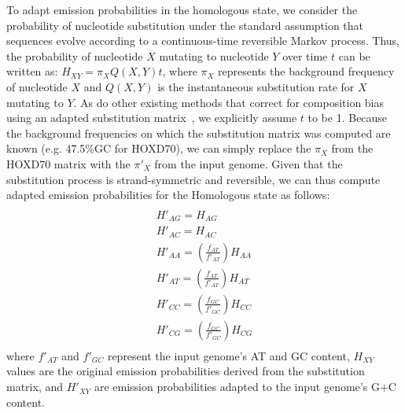 To adapt emission probabilities in the homologous state, we consider the
probability of nucleotide substitution under the standard assumption
that sequences evolve according to a continuous-time reversible Markov process.
Thus, the probability of nucleotide $X$ mutating to nucleotide $Y$ over time $t$
can be written as: $H_{XY}=\pi_X Q(X,Y)t$, where $\pi_X$ represents the background
frequency of nucleotide $X$ and $Q(X,Y)$ is the instantaneous substitution rate for $X$
mutating to $Y$. As do other existing methods that correct for composition bias using an adapted substitution matrix~\cite{repseek}, we explicitly assume $t$ to be 1.  Because the background frequencies on which the substitution matrix was computed are
known (e.g. 47.5\%GC for HOXD70), we can simply replace the $\pi_X$ from the HOXD70 matrix
with the $\pi'_X$ from the input genome. Given that the substitution process is
strand-symmetric and reversible, we can thus compute adapted
emission probabilities for the Homologous state as follows:
\begin{multline}\\
H'_{AG}=H_{AG}\\
H'_{AC}=H_{AC}\\
H'_{AA}=(\frac{f_{AT}}{f'_{AT}})H_{AA}\\
H'_{AT}=(\frac{f_{AT}}{f'_{AT}})H_{AT}\\
H'_{CC}=(\frac{f_{GC}}{f'_{GC}})H_{CC}\\
H'_{CG}=(\frac{f_{GC}}{f'_{GC}})H_{CG}\\
\end{multline}
where $f'_{AT}$ and $f'_{GC}$ represent the input genome's AT and GC content,
$H_{XY}$ values are the original emission probabilities derived from the
substitution matrix, and $H'_{XY}$ are emission probabilities adapted to
the input genome's G+C content.

